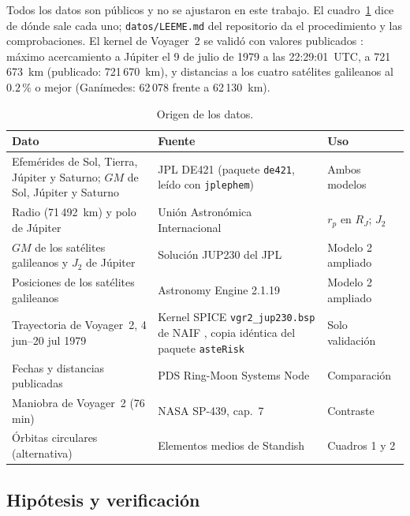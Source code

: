 \documentclass[11pt,letterpaper]{article}
\begin{document}
Todos los datos son públicos y no se ajustaron en este trabajo. El cuadro~\ref{tab:datos} dice de dónde sale cada uno; \texttt{datos/LEEME.md} del repositorio da el procedimiento y las comprobaciones. El kernel de Voyager~2 se validó con valores publicados \cite{pds}: máximo acercamiento a Júpiter el 9 de julio de 1979 a las 22:29:01~UTC, a 721\,673~km (publicado: 721\,670~km), y distancias a los cuatro satélites galileanos al $0.2\,\%$ o mejor (Ganímedes: 62\,078 frente a 62\,130~km).

\begin{table}[ht]\centering\footnotesize\renewcommand{\arraystretch}{1.05}
\caption{Origen de los datos.}\label{tab:datos}
\begin{tabular}{>{\raggedright\arraybackslash}p{4.1cm}>{\raggedright\arraybackslash}p{7.3cm}>{\raggedright\arraybackslash}p{3.1cm}}
\toprule
Dato & Fuente & Uso\\\midrule
Efemérides de Sol, Tierra, Júpiter y Saturno; $GM$ de Sol, Júpiter y Saturno & JPL DE421 \cite{folkner2009} (paquete \texttt{de421}, leído con \texttt{jplephem}) & Ambos modelos\\
Radio (71\,492~km) y polo de Júpiter & Unión Astronómica Internacional \cite{archinal2018} & $r_p$ en $R_J$; $J_2$\\
$GM$ de los satélites galileanos y $J_2$ de Júpiter & Solución JUP230 del JPL \cite{jacobson} & Modelo 2 ampliado\\
Posiciones de los satélites galileanos & Astronomy Engine 2.1.19 \cite{cross} & Modelo 2 ampliado\\
Trayectoria de Voyager~2, 4 jun--20 jul 1979 & Kernel SPICE \texttt{vgr2\_jup230.bsp} de NAIF \cite{acton1996}, copia idéntica del paquete \texttt{asteRisk} & Solo validación\\
Fechas y distancias publicadas & PDS Ring-Moon Systems Node \cite{pds} & Comparación\\
Maniobra de Voyager~2 (76 min) & NASA SP-439, cap.~7 \cite{morrison1980} & Contraste\\
Órbitas circulares (alternativa) & Elementos medios de Standish \cite{standish} & Cuadros 1 y 2\\
\bottomrule
\end{tabular}
\end{table}

\subsection{Hipótesis y verificación}
\end{document}
